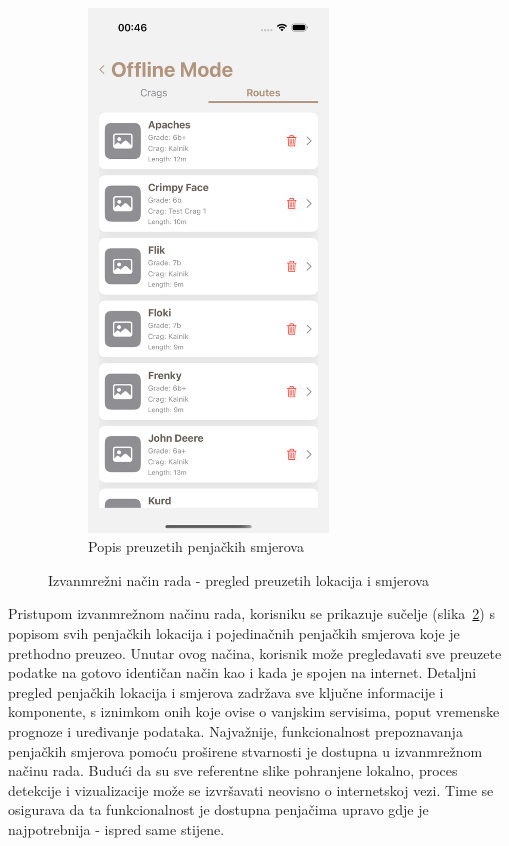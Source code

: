 \begin{figure}[H]
\begin{subfigure}[b]{0.4\textwidth}
        \includegraphics[width=0.7\textwidth]{images/implementacija/offline-mode/routes-tab.png}
        \caption{Popis preuzetih penjačkih smjerova}
        \label{fig:offline_routes_tab}
    \end{subfigure}
    \caption{Izvanmrežni način rada - pregled preuzetih lokacija i smjerova}
    \label{fig:izvanmrezni_nacin_rada}
\end{figure}

Pristupom izvanmrežnom načinu rada, korisniku se prikazuje sučelje (slika~\ref{fig:izvanmrezni_nacin_rada}) s popisom svih penjačkih lokacija i pojedinačnih penjačkih smjerova koje je prethodno preuzeo. Unutar ovog načina, korisnik može pregledavati sve preuzete podatke na gotovo identičan način kao i kada je spojen na internet. Detaljni pregled penjačkih lokacija i smjerova zadržava sve ključne informacije i komponente, s iznimkom onih koje ovise o vanjskim servisima, poput vremenske prognoze i uređivanje podataka.
Najvažnije, funkcionalnost prepoznavanja penjačkih smjerova pomoću proširene stvarnosti je dostupna u izvanmrežnom načinu rada. Budući da su sve referentne slike pohranjene lokalno, proces detekcije i vizualizacije može se izvršavati neovisno o internetskoj vezi. Time se osigurava da ta funkcionalnost je dostupna penjačima upravo gdje je najpotrebnija - ispred same stijene.
